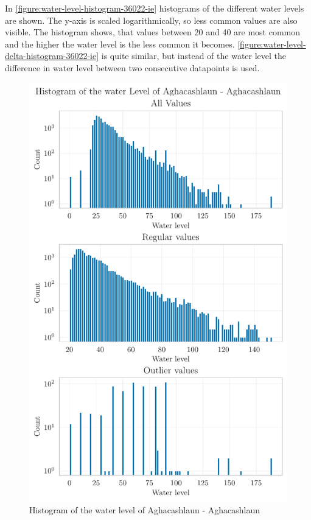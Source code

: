 In \autoref{figure:water-level-histogram-36022-ie} histograms of the different water levels are shown. The y-axis is scaled logarithmically, so less common values are also visible. The histogram shows, that values between 20 and 40 are most common and the higher the water level is the less common it becomes. \autoref{figure:water-level-delta-histogram-36022-ie} is quite similar, but instead of the water level the difference in water level between two consecutive datapoints is used.
\begin{figure}[htp]
    \centering 
    \includegraphics{./plots/pdfs/36022-ie/water_level_histogram_36022-ie.pdf}
    \caption{Histogram of the water level of Aghacashlaun - Aghacashlaun}
    \label{figure:water-level-histogram-36022-ie}
\end{figure}

